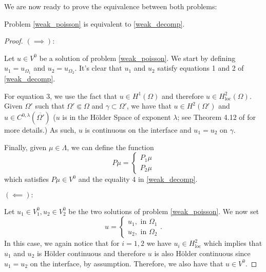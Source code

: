 We are now ready to prove the equivalence between both problems:
\begin{theorem}
    Problem \eqref{weak_poisson} is equivalent to \eqref{weak_decomp}.
\end{theorem}
\begin{proof}
    \((\implies):\)

    Let \(u \in V^0\) be a solution of problem \eqref{weak_poisson}. We start by defining \(u_1 = u_{\Omega_1}\) and \(u_2 = u_{\Omega_2}\). It's clear that \(u_1\) and \(u_2\) satisfy equations 1 and 2 of \eqref{weak_decomp}. 
    
    For equation 3, we use the fact that \(u \in H^1(\Omega)\) and therefore \(u \in H^2_{\text{loc}}(\Omega)\). Given \(\Omega'\) such that \(\Omega' \Subset \Omega\) and \(\gamma \subset \Omega'\), we have that \(u \in H^2(\Omega')\) and \(u \in C^{0,\lambda}(\overline{\Omega'})\) (\(u\) is in the H\"{o}lder Space of exponent \(\lambda\); see Theorem 4.12 of \cite{adams2003sobolev} for more details.) As such, \(u\) is continuous on the interface and \(u_1=u_2\) on \(\gamma\).

    Finally, given \(\mu \in \Lambda\), we can define the function
    \[
        P \mu =
    \begin{cases}
        P_1 \mu\\
        P_2 \mu
    \end{cases}
    \]
    which satisfies \(P \mu \in V^0\) and the equality 4 in \eqref{weak_decomp}.

    \vspace*{0.5cm}
    \((\impliedby):\)

    Let \(u_1 \in V_1^0, u_2 \in V_2^0\) be the two solutions of problem \eqref{weak_poisson}. We now set
    \[
    u=\begin{cases}
        u_1, \text{ in } \Omega_1\\
        u_2, \text{ in } \Omega_2
    \end{cases}.
    \]
    In this case, we again notice that for \(i=1, 2\) we have \(u_i \in H^2_{\text{loc}}\) which implies that \(u_1\) and \(u_2\) is H\"{o}lder continuous and therefore \(u\) is also H\"{o}lder continuous since \(u_1 = u_2\) on the interface, by assumption. Therefore, we also have that \(u \in V^0\). 
    

\end{proof}
